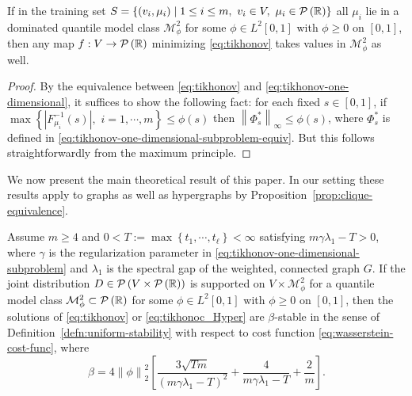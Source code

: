 \documentclass[letterpaper]{article} %
\begin{document}
\begin{lemma}
  \label{lem:apriori-estimates}
  If in the training set $S=\left\{ \left( v_i,\mu_i \right)\mid 1\leq i\leq m,\,\,v_i\in V,\,\,\mu_i\in\P\left( \mathbb{R} \right) \right\}$ all $\mu_i$ lie in a dominated quantile model class $\mathcal{M}_{\phi}^2$ for some $\phi\in L^2 \left[ 0,1 \right]$ with $\phi\geq 0$ on $\left[ 0,1 \right]$, then any map $f:V\rightarrow\P\left( \mathbb{R} \right)$ minimizing \eqref{eq:tikhonov} takes values in $\mathcal{M}_{\phi}^2$ as well.
\end{lemma}
\begin{proof}
  By the equivalence between \eqref{eq:tikhonov} and \eqref{eq:tikhonov-one-dimensional}, it suffices to show the following fact: for each fixed $s\in \left[ 0,1 \right]$, if $\max \left\{ \left|F_{\mu_i}^{-1} \left( s \right)\right|,\,\,i=1,\cdots,m\right\}\leq \phi \left( s \right)$ then $\left\|\Phi_s^{*}\right\|_{\infty}\leq \phi \left( s \right)$, where $\Phi_s^{*}$ is defined in \eqref{eq:tikhonov-one-dimensional-subproblem-equiv}. But this follows straightforwardly from the maximum principle.
\end{proof}

We now present the main theoretical result of this paper. In our setting these results apply to graphs as well as hypergraphs by Proposition~\ref{prop:clique-equivalence}.

\begin{proposition}
  \label{prop:alg-stability-slp}
  Assume $m\geq 4$ and $0<T:=\max \left\{ t_1,\cdots,t_{\ell} \right\}<\infty$ satisfying $m\gamma\lambda_1-T>0$, where $\gamma$ is the regularization parameter in \eqref{eq:tikhonov-one-dimensional-subproblem} and $\lambda_1$ is the spectral gap of the weighted, connected graph $G$. If the joint distribution $D\in\P\left( V\times \P\left( \mathbb{R} \right) \right)$ is supported on $V\times \mathcal{M}_{\phi}^2$ for a quantile model class $\mathcal{M}_{\phi}^2\subset \P\left( \mathbb{R} \right)$ for some $\phi\in L^2 \left[ 0,1 \right]$ with $\phi\geq 0$ on $\left[ 0,1 \right]$, then the solutions of \eqref{eq:tikhonov} or \eqref{eq:tikhonoc_Hyper} are $\beta$-stable in the sense of Definition~\ref{defn:uniform-stability} with respect to cost function \eqref{eq:wasserstein-cost-func}, where
  \begin{equation}
  \label{eq:beta-expression}
    \beta=4\left\| \phi \right\|_2^2\left[\frac{3\sqrt{Tm}}{\left( m\gamma\lambda_1-T \right)^2}+\frac{4}{m\gamma\lambda_1-T}+\frac{2}{m}\right].
  \end{equation}
\end{proposition}
\end{document}
